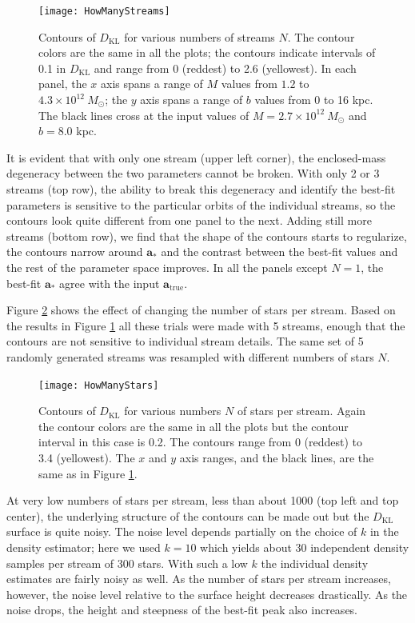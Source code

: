 \documentclass[useAMS,usenatbib,a4paper]{mn2e}
\newcommand{\sub}[2]{\ensuremath{#1_{\mathrm{#2}}}}
\begin{document}
\begin{figure}
 \texttt{[image: HowManyStreams]}
\caption{Contours of $\sub{D}{KL}$ for various numbers of streams $N$. The contour colors are the same in all the plots; the contours indicate intervals of 0.1 in $\sub{D}{KL}$ and range from 0 (reddest) to 2.6 (yellowest). In each panel, the $x$ axis spans a range of $M$ values from $1.2$ to $4.3 \times 10^{12}\ M_\odot$; the $y$ axis spans a range of $b$ values from 0 to 16 kpc. The black lines cross at the input values of $M = 2.7 \times 10^{12}\ M_\odot$ and $b = 8.0$ kpc.}
\label{fig:HowManyStreams}
\end{figure}

It is evident that with only one stream (upper left corner), the enclosed-mass degeneracy between the two parameters cannot be broken.  With only 2 or 3 streams (top row), the ability to break this degeneracy and identify the best-fit parameters is sensitive to the particular orbits of the individual streams, so the contours look quite different from one panel to the next. Adding still more streams (bottom row), we find that the shape of the contours starts to regularize, the contours narrow around $\mathbf{a}_*$ and the contrast between the best-fit values and the rest of the parameter space improves. In all the panels except $N=1$, the best-fit $\mathbf{a}_*$ agree with the input $\sub{\mathbf{a}}{true}$.


Figure \ref{fig:HowManyStars} shows the effect of changing the number of stars per stream. Based on the results in Figure \ref{fig:HowManyStreams} all these trials were made with 5 streams, enough that the contours are not sensitive to individual stream details. The same set of 5 randomly generated streams was resampled with different numbers of stars $N$.

\begin{figure}
 \texttt{[image: HowManyStars]}
\caption{Contours of $\sub{D}{KL}$ for various numbers $N$ of stars per stream. Again the contour colors are the same in all the plots but the contour interval in this case is 0.2. The contours range from 0 (reddest) to 3.4 (yellowest). The $x$ and $y$ axis ranges, and the black lines, are the same as in Figure \ref{fig:HowManyStreams}.}
\label{fig:HowManyStars}
\end{figure}

At very low numbers of stars per stream, less than about 1000 (top left and top center), the underlying structure of the contours can be made out but the $\sub{D}{KL}$ surface is quite noisy. The noise level depends partially on the choice of $k$ in the density estimator; here we used $k=10$ which yields about 30 independent density samples per stream of 300 stars. With such a low $k$ the individual density estimates are fairly noisy as well. As the number of stars per stream increases, however, the noise level relative to the surface height decreases drastically. As the noise drops, the height and steepness of the best-fit peak also increases.
\end{document}
